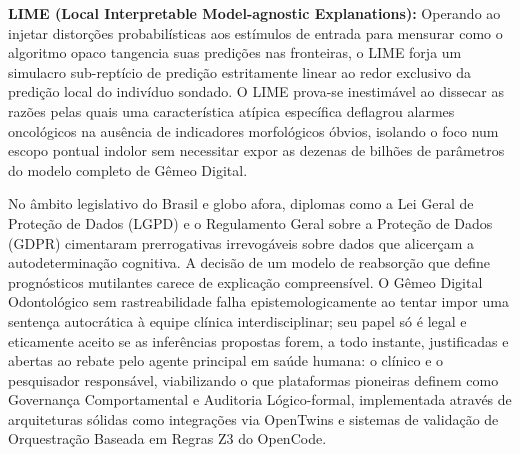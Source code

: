 \textbf{LIME (Local Interpretable Model-agnostic Explanations):} Operando ao injetar distorções probabilísticas aos estímulos de entrada para mensurar como o algoritmo opaco tangencia suas predições nas fronteiras, o LIME forja um simulacro sub-reptício de predição estritamente linear ao redor exclusivo da predição local do indivíduo sondado. O LIME prova-se inestimável ao dissecar as razões pelas quais uma característica atípica específica deflagrou alarmes oncológicos na ausência de indicadores morfológicos óbvios, isolando o foco num escopo pontual indolor sem necessitar expor as dezenas de bilhões de parâmetros do modelo completo de Gêmeo Digital.

No âmbito legislativo do Brasil e globo afora, diplomas como a Lei Geral de Proteção de Dados (LGPD) e o Regulamento Geral sobre a Proteção de Dados (GDPR) cimentaram prerrogativas irrevogáveis sobre dados que alicerçam a autodeterminação cognitiva. A decisão de um modelo de reabsorção que define prognósticos mutilantes carece de explicação compreensível. O Gêmeo Digital Odontológico sem rastreabilidade falha epistemologicamente ao tentar impor uma sentença autocrática à equipe clínica interdisciplinar; seu papel só é legal e eticamente aceito se as inferências propostas forem, a todo instante, justificadas e abertas ao rebate pelo agente principal em saúde humana: o clínico e o pesquisador responsável, viabilizando o que plataformas pioneiras definem como Governança Comportamental e Auditoria Lógico-formal, implementada através de arquiteturas sólidas como integrações via OpenTwins \cite{infante2024integrating} e sistemas de validação de Orquestração Baseada em Regras Z3 do OpenCode.
